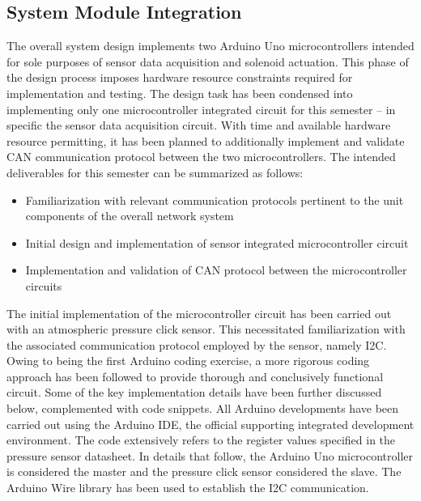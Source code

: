 \documentclass{article}
\begin{document}
\subsection{System Module Integration}
The overall system design implements two Arduino Uno microcontrollers intended for sole purposes of sensor data acquisition and solenoid actuation. This phase of the design process imposes hardware resource constraints required for implementation and testing. The design task has been condensed into implementing only one microcontroller integrated circuit for this semester – in specific the sensor data acquisition circuit. With time and available hardware resource permitting, it has been planned to additionally implement and validate CAN communication protocol between the two microcontrollers. The intended deliverables for this semester can be summarized as follows:

\begin{itemize}
  \item Familiarization with relevant communication protocols pertinent to the unit components of the overall network system
  \item Initial design and implementation of sensor integrated microcontroller circuit
  \item Implementation and validation of CAN protocol between the microcontroller circuits 
\end{itemize}

\noindent The initial implementation of the microcontroller circuit has been carried out with an atmospheric pressure click sensor. This necessitated familiarization with the associated communication protocol employed by the sensor, namely I2C. Owing to being the first Arduino coding exercise, a more rigorous coding approach has been followed to provide thorough and conclusively functional circuit. Some of the key implementation details have been further discussed below, complemented with code snippets. All Arduino developments have been carried out using the Arduino IDE, the official supporting integrated development environment. The code extensively refers to the register values specified in the pressure sensor datasheet. In details that follow, the Arduino Uno microcontroller is considered the master and the pressure click sensor considered the slave. The Arduino Wire library has been used to establish the I2C communication. \\
\end{document}
